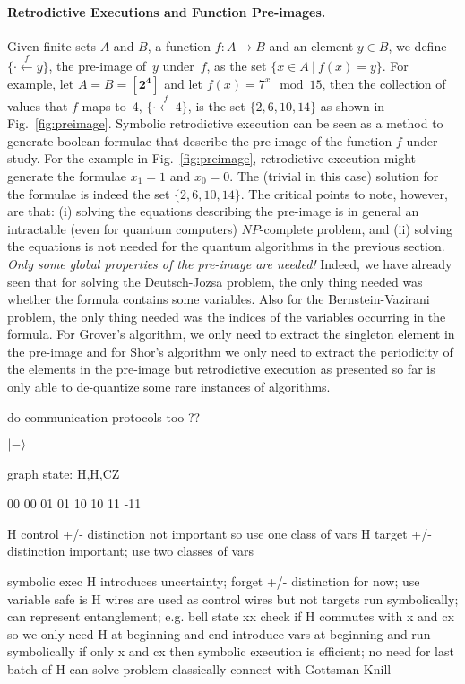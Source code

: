 \documentclass{article}
\newcommand{\preim}[2]{\{\cdot\stackrel{#1}{\longleftarrow}{#2}\}}
\newcommand{\finset}[1]{[\mathbf{#1}]}
\begin{document}
\begin{refsection}
\paragraph*{Retrodictive Executions and Function Pre-images.}
Given finite sets $A$ and $B$, a function $f : A \rightarrow B$ and an
element $y \in B$, we define $\preim{f}{y}$, the pre-image of~$y$
under~$f$, as the set $\{ x \in A ~|~ f(x) = y \}$. For example, let
$A = B = \finset{2^4}$ and let $f(x) = 7^x \mod 15$, then the
collection of values that $f$ maps to~4, $\preim{f}{4}$, is the set
$\{ 2, 6, 10, 14 \}$ as shown in Fig.~\ref{fig:preimage}. Symbolic
retrodictive execution can be seen as a method to generate boolean
formulae that describe the pre-image of the function $f$ under
study. For the example in Fig.~\ref{fig:preimage}, retrodictive
execution might generate the formulae $x_1=1$ and $x_0=0$. The
(trivial in this case) solution for the formulae is indeed the set $\{
2, 6, 10, 14 \}$. The critical points to note, however, are that: (i)
solving the equations describing the pre-image is in general an
intractable (even for quantum computers) $\mathit{NP}$-complete
problem, and (ii) solving the equations is not needed for the quantum
algorithms in the previous section. \emph{Only some global properties
  of the pre-image are needed!} Indeed, we have already seen that for
solving the Deutsch-Jozsa problem, the only thing needed was whether
the formula contains some variables. Also for the Bernstein-Vazirani
problem, the only thing needed was the indices of the variables
occurring in the formula. For Grover's algorithm, we only need to
extract the singleton element in the pre-image and for Shor's
algorithm we only need to extract the periodicity of the elements in
the pre-image but retrodictive execution as presented so far is only
able to de-quantize some rare instances of algorithms.

\newpage

do communication protocols too ??

$\ket{-}$ 

graph state: H,H,CZ

00   00
01   01
10   10
11 -11

H control +/- distinction not important so use one class of vars
H target +/- distinction important; use two classes of vars

  
  symbolic exec
  H introduces uncertainty; forget +/- distinction for now; use variable
  safe is H wires are used as control wires but not targets
  run symbolically; can represent entanglement; e.g. bell state xx
  check if H commutes with x and cx
  so we only need H at beginning and end
  introduce vars at beginning and run symbolically
  if only x and cx then symbolic execution is efficient; no need for last batch of H
  can solve problem classically
  connect with Gottsman-Knill


\end{refsection}
\end{document}
